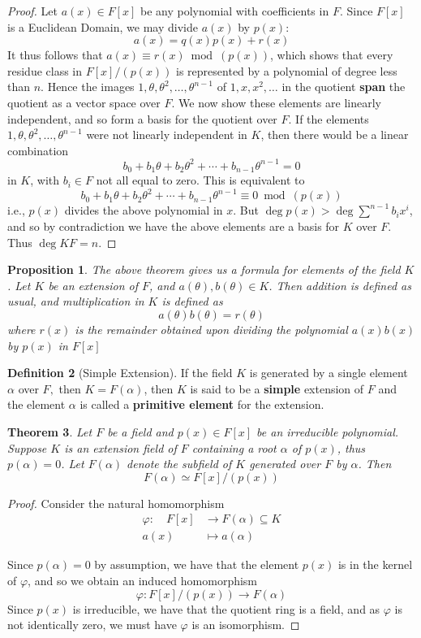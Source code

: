 \documentclass[10pt, oneside, reqno]{amsart}
\theoremstyle{plain}%
\newtheorem{thm}{Theorem}[section]
\newtheorem{prop}[thm]{Proposition}
\theoremstyle{definition}
\newtheorem{defn}[thm]{Definition}
\theoremstyle{remark}
\newcommand{\al}{\alpha}
\newcommand{\mapping}[5]{\begin{align*}
    #1 : \quad     #2 &\rightarrow #3 \\
            #4  &\mapsto #5
\end{align*}    
}
\begin{document}
\begin{proof}
    Let $a(x) \in F[x]$ be any polynomial with coefficients in $F$.  Since $F[x]$ is a Euclidean Domain, we may divide $a(x)$ by $p(x)$:\[
        a(x) = q(x)p(x) + r(x)
    \] 
    It thus follows that $a(x) \equiv r(x) \bmod (p(x))$, which shows that every residue class in $F[x]/(p(x))$ is represented by a polynomial of degree less than $n$. Hence the images $1, \theta, \theta^2,\dots, \theta^{n-1}$ of $1,x,x^2,\dots$ in the quotient \textbf{span} the quotient as a vector space over $F$.   We now show these elements are linearly independent, and so form a basis for the quotient over $F$.
    If the elements $1, \theta, \theta^2, \dots, \theta^{n-1}$ were not linearly independent in $K$, then there would be a linear combination\[
        b_0 + b_1 \theta + b_2 \theta^2 + \cdots + b_{n-1} \theta^{n-1} = 0
    \] in $K$, with $b_i \in F$ not all equal to zero.  This is equivalent to \[
    b_0 + b_1 \theta + b_2 \theta^2 + \cdots + b_{n-1} \theta^{n-1} \equiv 0 \bmod (p(x))
    \] i.e., $p(x)$ divides the above polynomial in $x$.  But $\deg p(x) > \deg{\sum^{n-1} b_i x^i}$, and so by contradiction we have the above elements are a basis for $K$ over $F$.  Thus $\deg{K}{F} = n$.
\end{proof}

\begin{prop}
    The above theorem gives us a formula for elements of the field $K$.  Let $K$ be an extension of $F$, and $a(\theta), b(\theta) \in K$.  Then addition is defined as usual, and multiplication in $K$ is defined as \[
        a(\theta) b(\theta) = r(\theta)
    \]  where $r(x)$ is the remainder obtained upon dividing the polynomial $a(x) b(x)$ by $p(x)$ in $F[x]$
\end{prop}

\begin{defn}[Simple Extension]
    If the field $K$ is generated by a single element $\al$ over $F,$ then $K = F(\al)$, then $K$ is said to be a \textbf{simple} extension of $F$ and the element $\al$ is called a \textbf{primitive element} for the extension.
\end{defn}

\begin{thm}
    Let $F$ be a field and $p(x) \in F[x]$ be an irreducible polynomial. Suppose $K$ is an extension field of $F$ containing a root $\al$ of $p(x)$, thus $p(\al) = 0$.  Let $F(\al)$ denote the subfield of $K$ generated over $F$ by $\al$.  Then \[
        F(\al) \simeq F[x]/(p(x))
    \]
\end{thm}
\begin{proof}
    Consider the natural homomorphism
    \mapping{\varphi}{F[x]}{F(\alpha) \subseteq K}{a(x)}{a(\alpha)}
    Since $p(\alpha) = 0$ by assumption, we have that the element $p(x)$ is in the kernel of $\varphi$, and so we obtain an induced homomorphism \[
        \varphi : F[x]/(p(x)) \rightarrow F(\al)
    \]
    Since $p(x)$ is irreducible, we have that the quotient ring is a field, and as $\varphi$ is not identically zero, we must have $\varphi$ is an isomorphism.
\end{proof}
\end{document}
